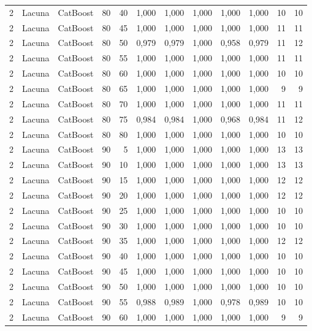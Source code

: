 \begin{longtable}{@{}rllrrrrrrrrr@{}}
2 & Lacuna & CatBoost & 80 & 40 & 1,000 & 1,000 & 1,000 & 1,000 & 1,000 & 10 & 10 \\
2 & Lacuna & CatBoost & 80 & 45 & 1,000 & 1,000 & 1,000 & 1,000 & 1,000 & 11 & 11 \\
2 & Lacuna & CatBoost & 80 & 50 & 0,979 & 0,979 & 1,000 & 0,958 & 0,979 & 11 & 12 \\
2 & Lacuna & CatBoost & 80 & 55 & 1,000 & 1,000 & 1,000 & 1,000 & 1,000 & 11 & 11 \\
2 & Lacuna & CatBoost & 80 & 60 & 1,000 & 1,000 & 1,000 & 1,000 & 1,000 & 10 & 10 \\
2 & Lacuna & CatBoost & 80 & 65 & 1,000 & 1,000 & 1,000 & 1,000 & 1,000 & 9 & 9 \\
2 & Lacuna & CatBoost & 80 & 70 & 1,000 & 1,000 & 1,000 & 1,000 & 1,000 & 11 & 11 \\
2 & Lacuna & CatBoost & 80 & 75 & 0,984 & 0,984 & 1,000 & 0,968 & 0,984 & 11 & 12 \\
2 & Lacuna & CatBoost & 80 & 80 & 1,000 & 1,000 & 1,000 & 1,000 & 1,000 & 10 & 10 \\
2 & Lacuna & CatBoost & 90 & 5 & 1,000 & 1,000 & 1,000 & 1,000 & 1,000 & 13 & 13 \\
2 & Lacuna & CatBoost & 90 & 10 & 1,000 & 1,000 & 1,000 & 1,000 & 1,000 & 13 & 13 \\
2 & Lacuna & CatBoost & 90 & 15 & 1,000 & 1,000 & 1,000 & 1,000 & 1,000 & 12 & 12 \\
2 & Lacuna & CatBoost & 90 & 20 & 1,000 & 1,000 & 1,000 & 1,000 & 1,000 & 12 & 12 \\
2 & Lacuna & CatBoost & 90 & 25 & 1,000 & 1,000 & 1,000 & 1,000 & 1,000 & 10 & 10 \\
2 & Lacuna & CatBoost & 90 & 30 & 1,000 & 1,000 & 1,000 & 1,000 & 1,000 & 10 & 10 \\
2 & Lacuna & CatBoost & 90 & 35 & 1,000 & 1,000 & 1,000 & 1,000 & 1,000 & 12 & 12 \\
2 & Lacuna & CatBoost & 90 & 40 & 1,000 & 1,000 & 1,000 & 1,000 & 1,000 & 10 & 10 \\
2 & Lacuna & CatBoost & 90 & 45 & 1,000 & 1,000 & 1,000 & 1,000 & 1,000 & 10 & 10 \\
2 & Lacuna & CatBoost & 90 & 50 & 1,000 & 1,000 & 1,000 & 1,000 & 1,000 & 10 & 10 \\
2 & Lacuna & CatBoost & 90 & 55 & 0,988 & 0,989 & 1,000 & 0,978 & 0,989 & 10 & 10 \\
2 & Lacuna & CatBoost & 90 & 60 & 1,000 & 1,000 & 1,000 & 1,000 & 1,000 & 9 & 9 \\

\end{longtable}
